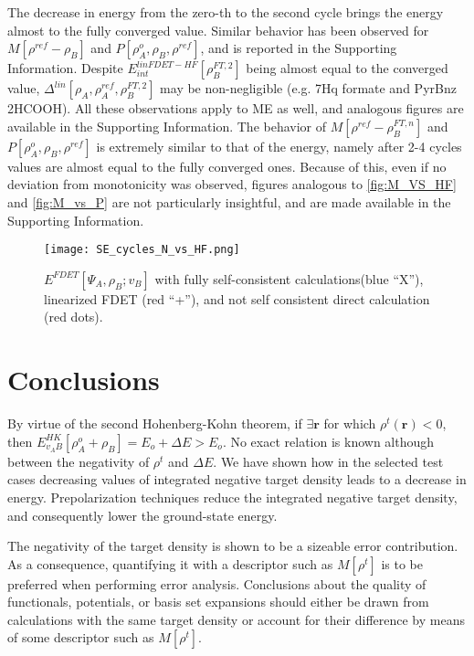 \documentclass[journal=jctcce,manuscript=article, layout=twocolumn]{achemso}
\begin{document}
The decrease in energy from the zero-th to the second cycle brings the energy almost to the fully converged value. Similar behavior has been observed for $M[\rho^{ref} - \rho_B]$ and $P[\rho^{o}_A, \rho_B, \rho^{ref}]$, and is reported in the Supporting Information. Despite $E^{linFDET-HF}_{int}[\rho_B^{FT,2}]$ being almost equal to the converged value, $\Delta^{lin}[\rho_A,\rho_A^{ref},\rho_B^{FT,2}]$ may be non-negligible (e.g. 7Hq formate and PyrBnz 2HCOOH). All these observations apply to ME as well, and analogous figures are available in the Supporting Information.
The behavior of $M[\rho^{ref} - \rho^{FT,n}_{B}]$ and $P[\rho^{o}_A, \rho_B, \rho^{ref}]$ is extremely similar to that of the energy, namely after 2-4 cycles values are almost equal to the fully converged ones. Because of this, even if no deviation from monotonicity was observed, figures analogous to \ref{fig:M_VS_HF} and \ref{fig:M_vs_P} are not particularly insightful, and are made available in the Supporting Information. 

\begin{figure}[H]
\centering
\texttt{[image: SE\_cycles\_N\_vs\_HF.png]}
\caption{$E^{FDET}[\Psi_A,\rho_B; v_B]$ with fully self-consistent calculations(blue ``X''), linearized FDET (red ``+''), and not self consistent direct calculation (red dots).}
\label{fig:N_vs_HF_SE}
\end{figure}

\section{Conclusions}
By virtue of the second Hohenberg-Kohn theorem, if $\exists \mathbf{r}$ for which $\rho^t(\mathbf{r}) < 0$, then $E^{HK}_{v_AB}[\rho_A^o + \rho_B] = E_o + \Delta E > E_o$.
No exact relation is known although between the negativity of $\rho^t$ and $\Delta E$.
We have shown how in the selected test cases decreasing values of integrated negative target density leads to a decrease in energy.
Prepolarization techniques reduce the integrated negative target density, and consequently lower the ground-state energy.

The negativity of the target density is shown to be a sizeable error contribution. As a consequence, quantifying it with a descriptor such as $M[\rho^t]$ is to be preferred when performing error analysis. Conclusions about the quality of functionals, potentials, or basis set expansions should either be drawn from calculations with the same target density or account for their difference by means of some descriptor such as $M[\rho^t]$.
\end{document}
